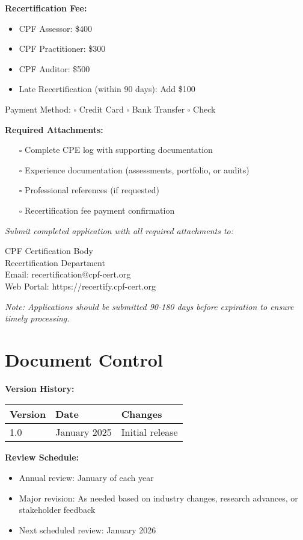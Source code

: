 \documentclass[11pt,a4paper]{article}
\begin{document}
\textbf{Recertification Fee:}
\begin{itemize}
\item CPF Assessor: \$400
\item CPF Practitioner: \$300
\item CPF Auditor: \$500
\item Late Recertification (within 90 days): Add \$100
\end{itemize}

Payment Method: $\square$ Credit Card $\square$ Bank Transfer $\square$ Check

\textbf{Required Attachments:}
\begin{itemize}
\item[$\square$] Complete CPE log with supporting documentation
\item[$\square$] Experience documentation (assessments, portfolio, or audits)
\item[$\square$] Professional references (if requested)
\item[$\square$] Recertification fee payment confirmation
\end{itemize}

\textit{Submit completed application with all required attachments to:}

CPF Certification Body\\
Recertification Department\\
Email: recertification@cpf-cert.org\\
Web Portal: https://recertify.cpf-cert.org

\textit{Note: Applications should be submitted 90-180 days before expiration to ensure timely processing.}

\section*{Document Control}

\textbf{Version History:}

\begin{tabular}{llp{8cm}}
\toprule
Version & Date & Changes \\
\midrule
1.0 & January 2025 & Initial release \\
\bottomrule
\end{tabular}

\vspace{1em}

\textbf{Review Schedule:}
\begin{itemize}
\item Annual review: January of each year
\item Major revision: As needed based on industry changes, research advances, or stakeholder feedback
\item Next scheduled review: January 2026
\end{itemize}
\end{document}
